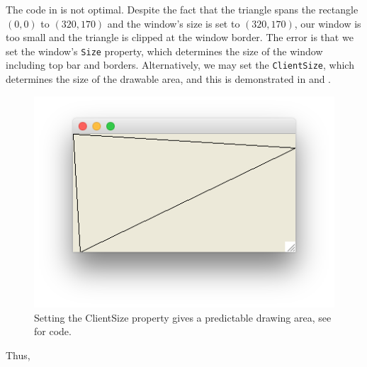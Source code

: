 \documentclass[fsharpnotes.tex]{subfiles}
\begin{document}
The code in  is not optimal. Despite the fact that the triangle spans the rectangle $(0,0)$ to $(320,170)$ and the window's size is set to $(320,170)$, our window is too small and the triangle is clipped at the window border. The error is that we set the window's \lstinline{Size} property, which determines the size of the window including top bar and borders. Alternatively, we may set the \lstinline{ClientSize}, which determines the size of the drawable area, and this is demonstrated in  and .
%
%
\begin{figure}
  \centering
  \includegraphics[scale=0.3]{triangleClientSize}
  \caption{Setting the ClientSize property gives a predictable drawing area, see  for code.}
  \label{fig:triangleClientSize}
\end{figure}
%
Thus, 
\end{document}
